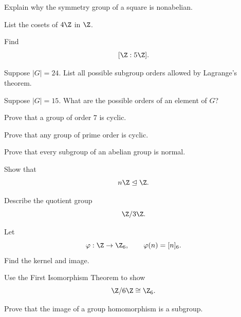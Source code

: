 \begin{exercise}[2]
Explain why the symmetry group of a square is nonabelian.
\end{exercise}

\begin{exercise}[2]
List the cosets of \(4\Z\) in \(\Z\).
\end{exercise}

\begin{exercise}[2]
Find
\[ [\Z:5\Z]. \]
\end{exercise}

\begin{exercise}[2]
Suppose \(|G|=24\). List all possible subgroup orders allowed by Lagrange's
theorem.
\end{exercise}

\begin{exercise}[2]
Suppose \(|G|=15\). What are the possible orders of an element of \(G\)?
\end{exercise}

\begin{exercise}[2]
Prove that a group of order \(7\) is cyclic.
\end{exercise}

\begin{exercise}[3]
Prove that any group of prime order is cyclic.
\end{exercise}

\begin{exercise}[2]
Prove that every subgroup of an abelian group is normal.
\end{exercise}

\begin{exercise}[2]
Show that
\[ n\Z\trianglelefteq\Z. \]
\end{exercise}

\begin{exercise}[2]
Describe the quotient group
\[ \Z/3\Z. \]
\end{exercise}

\begin{exercise}[2]
Let
\[ \varphi:\Z\to\Z_6,\qquad\varphi(n)=[n]_6. \]
Find the kernel and image.
\end{exercise}

\begin{exercise}[3]
Use the First Isomorphism Theorem to show
\[ \Z/6\Z\cong\Z_6. \]
\end{exercise}

\begin{exercise}[2]
Prove that the image of a group homomorphism is a subgroup.
\end{exercise}

